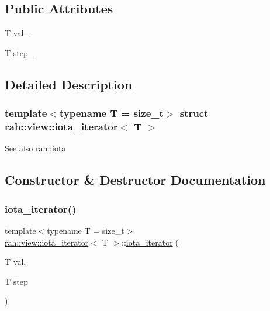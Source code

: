 \subsection*{Public Attributes}
\begin{DoxyCompactItemize}
\item 
T \mbox{\hyperlink{structrah_1_1view_1_1iota__iterator_a7a2ef77dc1a09b2eea42804c2297d057}{val\+\_\+}}
\item 
T \mbox{\hyperlink{structrah_1_1view_1_1iota__iterator_ac30abc689d8d82810bf78ceec3893bd2}{step\+\_\+}}
\end{DoxyCompactItemize}


\subsection{Detailed Description}
\subsubsection*{template$<$typename T = size\+\_\+t$>$\newline
struct rah\+::view\+::iota\+\_\+iterator$<$ T $>$}

\begin{DoxySeeAlso}{See also}
rah\+::iota 
\end{DoxySeeAlso}


\subsection{Constructor \& Destructor Documentation}
\mbox{\label{structrah_1_1view_1_1iota__iterator_a7807733a9a9609f8b9652e270551dc9b}} 
\subsubsection{\texorpdfstring{iota\_iterator()}{iota\_iterator()}}
{\footnotesize\ttfamily template$<$typename T  = size\+\_\+t$>$ \\
\mbox{\hyperlink{structrah_1_1view_1_1iota__iterator}{rah\+::view\+::iota\+\_\+iterator}}$<$ T $>$\+::\mbox{\hyperlink{structrah_1_1view_1_1iota__iterator}{iota\+\_\+iterator}} (\begin{DoxyParamCaption}\item[{T}]{val,  }\item[{T}]{step }\end{DoxyParamCaption})\hspace{0.3cm}{\ttfamily [inline]}}



